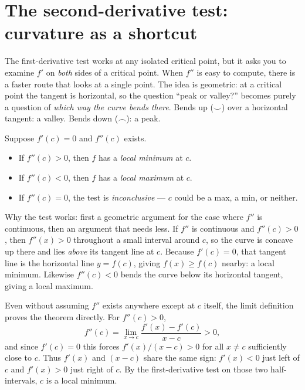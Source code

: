 \section{The second-derivative test: curvature as a shortcut}

The first-derivative test works at any isolated critical point, but it asks you to examine $f'$ on
\emph{both} sides of a critical point. When $f''$ is easy to compute, there is a
faster route that looks at a single point. The idea is geometric:
at a critical point the tangent is horizontal, so the question ``peak or valley?''
becomes purely a question of \emph{which way the curve bends there}. Bends up
($\smile$) over a horizontal tangent: a valley. Bends down ($\frown$): a peak.

\begin{theorem}\label{ch16:thm-sdt}
Suppose $f'(c)=0$ and $f''(c)$ exists.
\begin{itemize}
\item If $f''(c)>0$, then $f$ has a \emph{local minimum} at $c$.
\item If $f''(c)<0$, then $f$ has a \emph{local maximum} at $c$.
\item If $f''(c)=0$, the test is \emph{inconclusive} --- $c$ could be a max, a min,
or neither.
\end{itemize}
\end{theorem}

\begin{whybox}
Why the test works: first a geometric argument for the case where $f''$ is
continuous, then an argument that needs less. If $f''$ is continuous and $f''(c)>0$, then $f''(x)>0$ throughout a
small interval around $c$, so the curve is concave up there and lies \emph{above} its
tangent line at $c$. Because $f'(c)=0$, that tangent line is the horizontal line
$y=f(c)$, giving $f(x)\ge f(c)$ nearby: a local minimum. Likewise $f''(c)<0$ bends the
curve below its horizontal tangent, giving a local maximum.

Even without assuming $f''$ exists anywhere except at $c$ itself, the limit
definition proves the theorem directly. For $f''(c)>0$,
\[
f''(c)=\lim_{x\to c}\frac{f'(x)-f'(c)}{x-c}>0,
\]
and since $f'(c)=0$ this forces $f'(x)/(x-c)>0$ for all $x\ne c$ sufficiently
close to $c$. Thus $f'(x)$ and
$(x-c)$ share the same sign: $f'(x)<0$ just left of $c$ and $f'(x)>0$ just right of
$c$. By the first-derivative test on those two half-intervals, $c$ is a local minimum.
\end{whybox}

